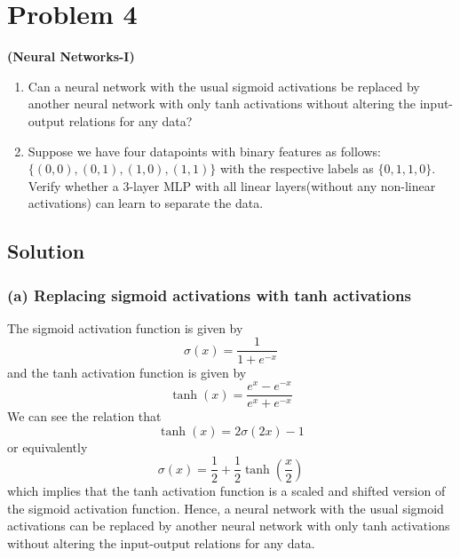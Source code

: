 \section*{Problem 4}

\textbf{(Neural Networks-I)}
\begin{enumerate}[label= (\alph*), noitemsep, topsep=0pt]
    \item Can a neural network with the usual sigmoid activations be replaced by another neural network with only tanh activations without altering the input-output relations for any data?

    \item Suppose we have four datapoints with binary features as follows:\\
          \( \{(0,0),(0,1),(1,0),(1,1)\} \) with the respective labels as \( \{0,1,1,0\} \).
          Verify whether a 3-layer MLP with all linear layers(without any non-linear activations) can learn to separate the data.
\end{enumerate}

\subsection*{Solution}

\subsubsection*{(a) Replacing sigmoid activations with tanh activations}

The sigmoid activation function is given by
\begin{equation*}
    \sigma(x)
    = \frac{1}{1 + e^{-x}}
\end{equation*}
and the tanh activation function is given by
\begin{equation*}
    \tanh(x)
    = \frac{e^x - e^{-x}}{e^x + e^{-x}}
\end{equation*}
We can see the relation that
\begin{equation*}
    \tanh(x)
    = 2\sigma(2x) - 1
\end{equation*}
or equivalently
\begin{equation*}
    \sigma(x)
    = \frac{1}{2} + \frac{1}{2} \tanh \left( \frac{x}{2} \right)
\end{equation*}
which implies that the tanh activation function is a scaled and shifted version of the sigmoid activation function.
Hence, a neural network with the usual sigmoid activations can be replaced by another neural network with only tanh activations without altering the input-output relations for any data.

